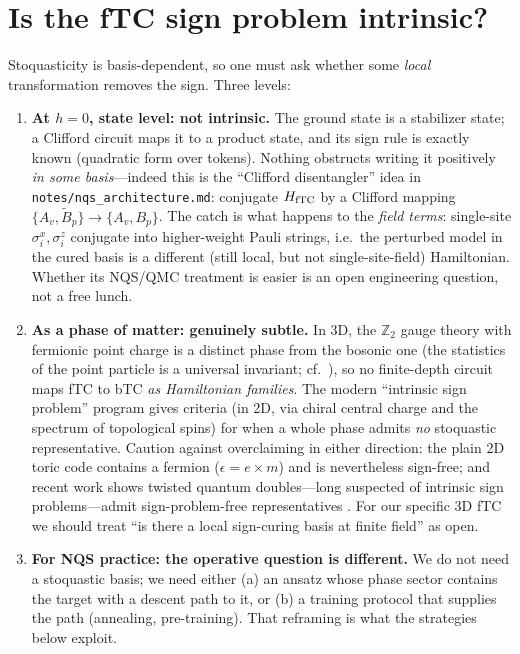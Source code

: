 \documentclass[11pt]{article}
\newcommand{\Av}{A_v}
\newcommand{\Bp}{B_p}
\newcommand{\Bt}{\tilde B_p}
\newcommand{\sx}{\sigma^x}
\newcommand{\sz}{\sigma^z}
\begin{document}
\section{Is the fTC sign problem intrinsic?}
\label{sec:intrinsic}

Stoquasticity is basis-dependent, so one must ask whether some \emph{local}
transformation removes the sign. Three levels:
\begin{enumerate}
\item \textbf{At $h=0$, state level: not intrinsic.} The ground state is a
stabilizer state; a Clifford circuit maps it to a product state, and its sign
rule is exactly known (quadratic form over tokens). Nothing obstructs writing
it positively \emph{in some basis}---indeed this is the ``Clifford
disentangler'' idea in \texttt{notes/nqs\_architecture.md}: conjugate
$H_{\rm fTC}$ by a Clifford mapping $\{\Av,\Bt\}\to\{\Av,\Bp\}$. The catch is
what happens to the \emph{field terms}: single-site $\sx_i,\sz_i$ conjugate
into higher-weight Pauli strings, i.e.\ the perturbed model in the cured basis
is a different (still local, but not single-site-field) Hamiltonian. Whether
its NQS/QMC treatment is easier is an open engineering question, not a free
lunch.
\item \textbf{As a phase of matter: genuinely subtle.} In 3D, the
$\mathbb{Z}_2$ gauge theory with fermionic point charge is a distinct phase
from the bosonic one (the statistics of the point particle is a universal
invariant; cf.~\cite{LevinWen2003,ChenKapustin2019,WangLevin2014}), so no
finite-depth circuit maps fTC to bTC \emph{as Hamiltonian families}. The
modern ``intrinsic sign problem'' program
\cite{SmithGolanRingel2020,GolanSmithRingel2020} gives criteria (in 2D, via
chiral central charge and the spectrum of topological spins) for when a whole
phase admits \emph{no} stoquastic representative. Caution against
overclaiming in either direction: the plain 2D toric code contains a fermion
($\epsilon=e\times m$) and is nevertheless sign-free; and recent work shows
twisted quantum doubles---long suspected of intrinsic sign problems---admit
sign-problem-free representatives \cite{TwistedDoubles2025}. For our specific
3D fTC we should treat ``is there a local sign-curing basis at finite field''
as open.
\item \textbf{For NQS practice: the operative question is different.} We do
not need a stoquastic basis; we need either (a) an ansatz whose phase sector
contains the target with a descent path to it, or (b) a training protocol
that supplies the path (annealing, pre-training). That reframing is what the
strategies below exploit.
\end{enumerate}
\end{document}
